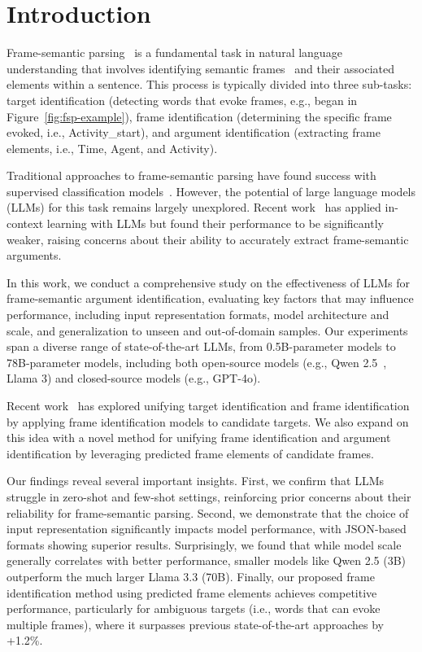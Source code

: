 \section{Introduction}
Frame-semantic parsing~\cite{gildea-jurafsky-2002-automatic} is a fundamental task in natural language understanding that involves identifying semantic frames~\cite{baker-etal-1998-berkeley-framenet} and their associated elements within a sentence. This process is typically divided into three sub-tasks: target identification (detecting words that evoke frames, e.g., began in Figure~\ref{fig:fsp-example}), frame identification (determining the specific frame evoked, i.e., Activity\_start), and argument identification (extracting frame elements, i.e., Time, Agent, and Activity).

Traditional approaches to frame-semantic parsing have found success with supervised classification models~\cite{chakma2024semantic}. However, the potential of large language models (LLMs) for this task remains largely unexplored. Recent work~\cite{Su2024} has applied in-context learning with LLMs but found their performance to be significantly weaker, raising concerns about their ability to accurately extract frame-semantic arguments.



In this work, we conduct a comprehensive study on the effectiveness of LLMs for frame-semantic argument identification, evaluating key factors that may influence performance, including input representation formats, model architecture and scale, and generalization to unseen and out-of-domain samples. Our experiments span a diverse range of state-of-the-art LLMs, from 0.5B-parameter models to 78B-parameter models, including both open-source models (e.g., Qwen 2.5~\cite{qwen2025qwen25technicalreport}, Llama 3) and closed-source models (e.g., GPT-4o).

Recent work~\cite{devasier-etal-2024-robust} has explored unifying target identification and frame identification by applying frame identification models to candidate targets. We also expand on this idea with a novel method for unifying frame identification and argument identification by leveraging predicted frame elements of candidate frames. 

Our findings reveal several important insights. First, we confirm that LLMs struggle in zero-shot and few-shot settings, reinforcing prior concerns about their reliability for frame-semantic parsing. Second, we demonstrate that the choice of input representation significantly impacts model performance, with JSON-based formats showing superior results. Surprisingly, we found that while model scale generally correlates with better performance, smaller models like Qwen 2.5 (3B) outperform the much larger Llama 3.3 (70B). Finally, our proposed frame identification method using predicted frame elements achieves competitive performance, particularly for ambiguous targets (i.e., words that can evoke multiple frames), where it surpasses previous state-of-the-art approaches by +1.2\%.

